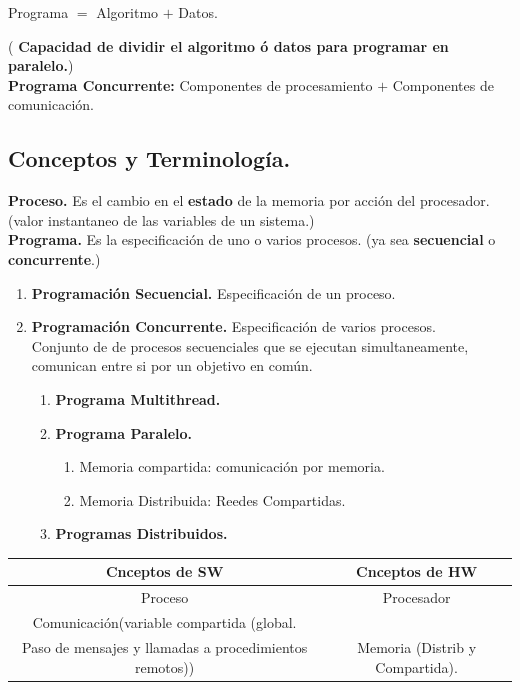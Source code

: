 \documentclass[12pt]{article}
\begin{document}
Programa $=$ Algoritmo $+$ Datos.

({\color{red} \textbf{Capacidad de dividir el algoritmo ó datos para programar en paralelo.}})\\

{\color{red} \textbf{Programa Concurrente:}} Componentes de procesamiento $+$ Componentes de comunicación.\\

{\color{blue} \subsection*{\textbf{Conceptos y Terminología.}}}
\vspace{1em}

{\color{red} \textbf{Proceso.}} Es el cambio en el \textbf{estado} de la memoria por acción del procesador. (valor instantaneo de las variables de un sistema.)\\

{\color{red} \textbf{Programa.}} Es la especificación de uno o varios procesos. (ya sea \textbf{secuencial} o \textbf{concurrente}.)
\vspace{2em}\\

\begin{enumerate} 
    \item {\color{red} \textbf{Programación Secuencial.}} Especificación de un proceso.
    \item {\color{red} \textbf{Programación Concurrente.}} Especificación de varios procesos.\\
    Conjunto de de procesos secuenciales que se ejecutan simultaneamente, comunican entre si por un objetivo en común.
    \begin{enumerate}
        \item \textbf{Programa Multithread.}
        \item \textbf{Programa Paralelo.}
        \begin{enumerate}
            \item Memoria compartida: comunicación por memoria.
            \item Memoria Distribuida: Reedes Compartidas.
        \end{enumerate}
        \item \textbf{Programas Distribuidos.}
    \end{enumerate}
\end{enumerate}

\begin{tabular}{| c | c |}
    \hline
    \textbf{Cnceptos de SW} & \textbf{Cnceptos de HW} \\ \hline
    Proceso & Procesador \\
    Comunicación(variable compartida (global.\\
    Paso de mensajes y llamadas a procedimientos remotos)) & Memoria (Distrib y Compartida).
\end{tabular}\\
\end{document}
